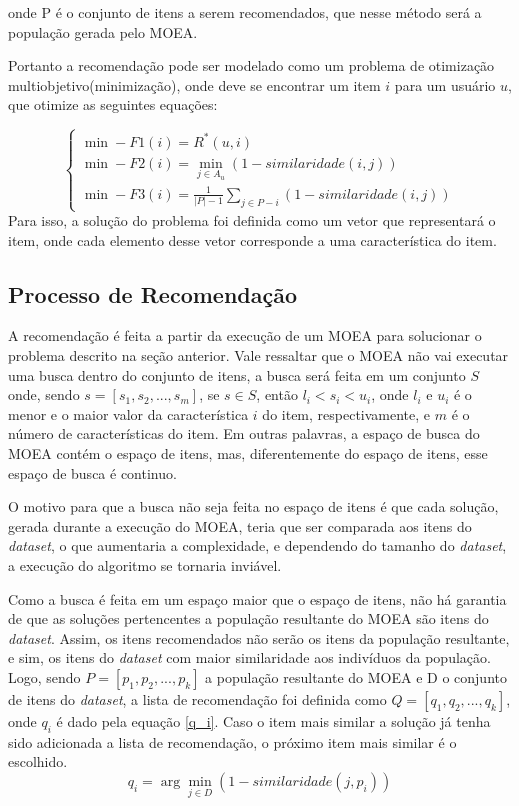 onde P é o conjunto de itens a serem recomendados, que nesse método será a população gerada pelo MOEA. 

Portanto a recomendação pode ser modelado como um problema de otimização multiobjetivo(minimização), onde deve se encontrar um item \(i\) para um usuário \(u\), que otimize as seguintes equações:

\label{problema}
\[
\left\{
        \begin{array}{ll}
          \min - F1(i) = R^*(u, i) \\ 
          \min  - F2(i) = \min_{j \in A_u} (1 - similaridade(i,j)) \\ 
          \min - F3(i) = \frac{1}{|P| - 1}\sum_{j \in P - i} (1 - similaridade(i,j))
        \end{array}
      \right.
\]
Para isso, a solução do problema foi definida como um vetor que representará o item, onde cada elemento desse vetor corresponde a uma característica do item.

\subsection{Processo de Recomendação}

A recomendação é feita a partir da execução de um MOEA para solucionar o problema descrito na seção anterior. Vale ressaltar que o MOEA não vai executar uma busca dentro do conjunto de itens, a busca será feita em um conjunto \(S\) onde, sendo \(s = [s_1, s_2, ..., s_m ]\), se \(s \in S\), então  \(l_i< s_i < u_i\), onde \(l_i\) e \(u_i\) é o menor e o maior valor da característica \(i\) do item, respectivamente, e  \(m\) é o número de características do item.  Em outras palavras, a espaço de busca do MOEA contém o espaço de itens, mas, diferentemente do espaço de itens, esse espaço de busca é continuo.

O motivo para que a busca não seja feita no espaço de itens é que cada solução, gerada durante a execução do MOEA, teria que ser comparada aos itens do \textit{dataset}, o que aumentaria a complexidade, e dependendo do tamanho do \textit{dataset}, a execução do algoritmo se tornaria inviável. 

Como a busca é feita em um espaço maior que o espaço de itens, não há garantia de que as soluções pertencentes a população resultante do MOEA são itens do \textit{dataset}. Assim, os itens recomendados não serão os itens da população resultante, e sim, os itens do \textit{dataset} com maior similaridade aos indivíduos da população. Logo, sendo \(P=[p_1, p_2, ..., p_k]\) a população resultante do MOEA e D o conjunto de itens do \textit{dataset}, a lista de recomendação foi definida como  \(Q = [q_1, q_2, ..., q_k]\), onde \(q_i\) é dado pela equação \ref{q_i}. Caso o item mais similar a solução já tenha sido adicionada a lista de recomendação, o próximo item mais similar é o escolhido. 
\begin{equation}
\label{q_i}
    q_i = \arg \min_{j \in D} (1 - similaridade(j,p_i))
\end{equation}


